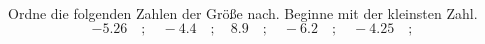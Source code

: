 \begin{aufgabe} ~ \\ 
Ordne die folgenden Zahlen der Gr\"o\ss{}e nach. Beginne mit der kleinsten Zahl.\[-5.26\quad ; \quad-4.4\quad ; \quad8.9\quad ; \quad-6.2\quad ; \quad-4.25\quad ; \quad\]\end{aufgabe} 
